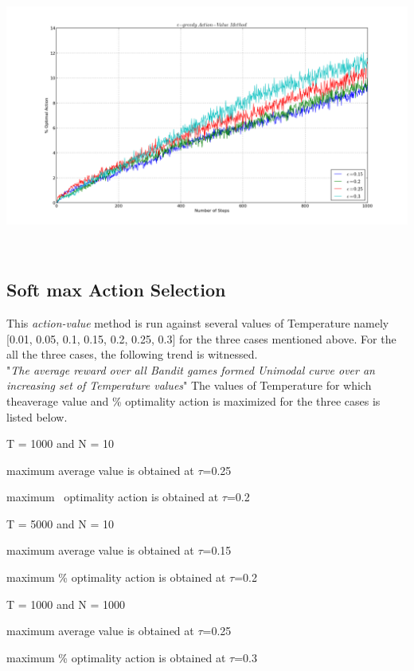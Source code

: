 \documentclass[a4paper,10pt]{report}
\newenvironment{my_itemize}{
\begin{itemize}
  \setlength{\itemsep}{1pt}
  \setlength{\parskip}{0pt}
  \setlength{\parsep}{0pt}}{
\end{itemize}}
\begin{document}
\begin{my_itemize}
\begin{center}
\centerline{\includegraphics*[width=180mm, height=90mm]{EpsOpt1-1000-1000.png}}
\end{center}
\end{my_itemize}
\pagebreak
\subsection{Soft max Action Selection}
This \emph{action-value} method is run against several values of Temperature namely [0.01, 0.05, 0.1, 0.15, 0.2, 0.25, 0.3] for the three cases mentioned above.
For the all the three cases, the following trend is witnessed.\\
"\emph{The average reward over all Bandit games formed Unimodal curve over an increasing set of Temperature values}"
The values of Temperature for which theaverage value and \% optimality action is maximized for the three cases is listed below.

\begin{my_itemize}
\item T = 1000 and N = 10
	\begin{my_itemize}
		\item maximum average value is obtained at $\tau$=0.25
		\item maximum \ optimality action is obtained at $\tau$=0.2
	\end{my_itemize}
\item T = 5000 and N = 10
	\begin{my_itemize}
		\item maximum average value is obtained at $\tau$=0.15
		\item maximum \% optimality action is obtained at $\tau$=0.2
	\end{my_itemize}
\item T = 1000 and N = 1000
	\begin{my_itemize}
		\item maximum average value is obtained at $\tau$=0.25
		\item maximum \% optimality action is obtained at $\tau$=0.3
	\end{my_itemize}
\end{my_itemize}
\end{document}
